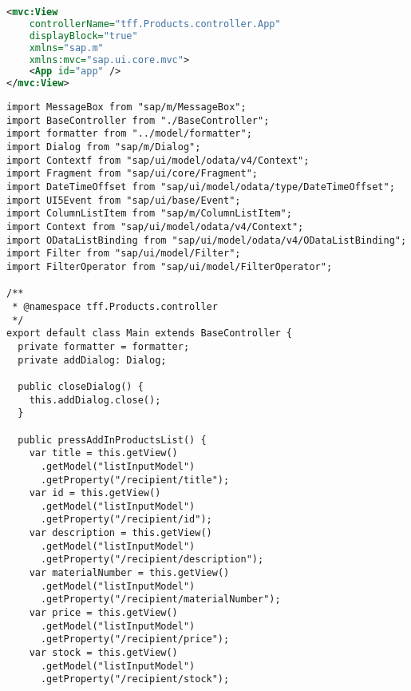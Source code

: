 \begin{mdframed}[backgroundcolor=mygrey2, leftmargin=0.5cm, hidealllines=true, innerleftmargin=3pt, innerrightmargin=0cm, innertopmargin=0cm, innerbottommargin=-3cm, splitbottomskip=0]
\begin{lstlisting}[language=XML,  caption={App view der Anwendung in XML Format}]
<mvc:View
	controllerName="tff.Products.controller.App"
	displayBlock="true"
	xmlns="sap.m"
	xmlns:mvc="sap.ui.core.mvc">
	<App id="app" />
</mvc:View>
\end{lstlisting}
\end{mdframed}

\begin{mdframed}[backgroundcolor=mygrey2, leftmargin=0.5cm, hidealllines=true, innerleftmargin=3pt, innerrightmargin=0cm, innertopmargin=0cm, innerbottommargin=-3cm, splitbottomskip=0]
\begin{lstlisting}[emph={event, UI5Event, listItem, detail, path}, caption=Main Controller der Anwendung]
import MessageBox from "sap/m/MessageBox";
import BaseController from "./BaseController";
import formatter from "../model/formatter";
import Dialog from "sap/m/Dialog";
import Contextf from "sap/ui/model/odata/v4/Context";
import Fragment from "sap/ui/core/Fragment";
import DateTimeOffset from "sap/ui/model/odata/type/DateTimeOffset";
import UI5Event from "sap/ui/base/Event";
import ColumnListItem from "sap/m/ColumnListItem";
import Context from "sap/ui/model/odata/v4/Context";
import ODataListBinding from "sap/ui/model/odata/v4/ODataListBinding";
import Filter from "sap/ui/model/Filter";
import FilterOperator from "sap/ui/model/FilterOperator";

/**
 * @namespace tff.Products.controller
 */
export default class Main extends BaseController {
  private formatter = formatter;
  private addDialog: Dialog;

  public closeDialog() {
    this.addDialog.close();
  }

  public pressAddInProductsList() {
    var title = this.getView()
      .getModel("listInputModel")
      .getProperty("/recipient/title");
    var id = this.getView()
      .getModel("listInputModel")
      .getProperty("/recipient/id");
    var description = this.getView()
      .getModel("listInputModel")
      .getProperty("/recipient/description");
    var materialNumber = this.getView()
      .getModel("listInputModel")
      .getProperty("/recipient/materialNumber");
    var price = this.getView()
      .getModel("listInputModel")
      .getProperty("/recipient/price");
    var stock = this.getView()
      .getModel("listInputModel")
      .getProperty("/recipient/stock");


\end{lstlisting}
\end{mdframed}
